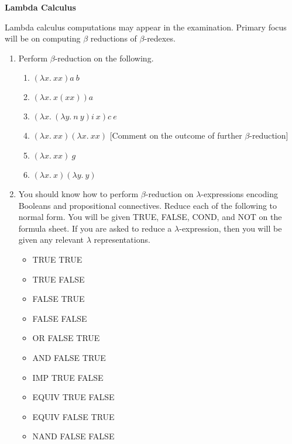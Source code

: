 \documentclass[11pt]{report}
\begin{document}
\newpage
{\bf Lambda Calculus}

Lambda calculus computations may appear in the examination. Primary focus will be on computing $\beta$ reductions of $\beta$-redexes. 

\begin{enumerate}
	\item Perform $\beta$-reduction on the following. 

	\begin{enumerate}
		\item $(\lambda x . \ xx)a \ b$
		\item $(\lambda x . \ x (x x))a$
		\item $(\lambda x . \ (\lambda y . \ n \ y)i \ x)c \ e$
		\item $(\lambda x . \ x x)(\lambda x. \ x x)$ [Comment on the outcome of further $\beta$-reduction]
		\item $(\lambda x . \ x x) \ g$
		\item $(\lambda x . \ x)(\lambda y . \ y) $
	\end{enumerate}

	\item You should know how to perform $\beta$-reduction on $\lambda$-expressions encoding Booleans and propositional connectives. Reduce each of the following to normal form. You will be given TRUE, FALSE, COND, and NOT on the formula sheet. If you are asked to reduce a $\lambda$-expression, then you will be given any relevant $\lambda$ representations. 
	
		\begin{itemize}
			\item TRUE TRUE 
			\item TRUE FALSE 
			\item FALSE TRUE 
			\item FALSE FALSE
			\item OR FALSE TRUE 
			\item AND FALSE TRUE
			\item IMP TRUE FALSE 
			\item EQUIV TRUE FALSE 
			\item EQUIV FALSE TRUE
			\item NAND FALSE FALSE
		\end{itemize}


\end{enumerate}
\end{document}
